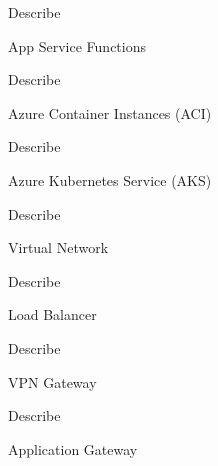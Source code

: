 \documentclass{scrartcl}
\newenvironment{flashcard}[2][]{%
    #1
    \vfill
    \centerline{\Large{#2}}
    \vfill
    \newpage
}
{\newpage}
\begin{document}
    \begin{flashcard}[Describe]{App Service Functions}

    \end{flashcard}

    \begin{flashcard}[Describe]{Azure Container Instances (ACI)}

    \end{flashcard}

    \begin{flashcard}[Describe]{Azure Kubernetes Service (AKS)}

    \end{flashcard}

    \begin{flashcard}[Describe]{Virtual Network}

    \end{flashcard}

    \begin{flashcard}[Describe]{Load Balancer}

    \end{flashcard}

    \begin{flashcard}[Describe]{VPN Gateway}

    \end{flashcard}

    \begin{flashcard}[Describe]{Application Gateway}

    \end{flashcard}
\end{document}
